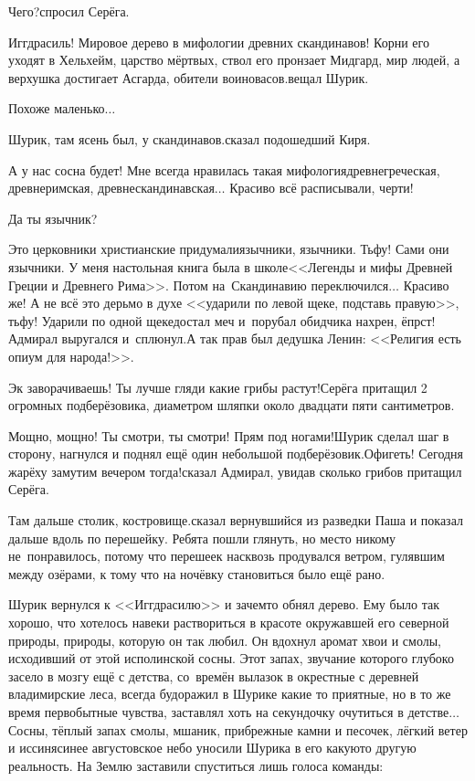 \diagdash Чего?\mdash спросил Серёга.

\diagdash Иггдрасиль! Мировое дерево в мифологии древних скандинавов! Корни его уходят в Хельхейм, царство мёртвых, ствол его пронзает Мидгард, мир людей, а верхушка достигает Асгарда, обители воинов\sdash асов.\mdash вещал Шурик. 

\diagdash Похоже маленько$\ldots$

\diagdash Шурик, там ясень был, у скандинавов.\mdash сказал подошедший Киря.

\diagdash А у нас сосна будет! Мне всегда нравилась такая мифология\mdash древнегреческая, древнеримская, древнескандинавская$\ldots$ Красиво всё расписывали, черти!

\diagdash Да ты язычник?

\diagdash Это церковники христианские придумали\mdash язычники, язычники. Тьфу! Сами они язычники. У меня настольная книга была в школе\mdash <<Легенды и мифы Древней Греции и Древнего Рима>>\cite{Кун}. Потом на~Скандинавию переключился$\ldots$ Красиво же! А не всё это дерьмо в духе <<ударили по левой щеке, подставь правую>>, тьфу! Ударили по одной щеке\mdash достал меч и~порубал обидчика нахрен, ёпрст!\mdash Адмирал выругался и~сплюнул.\mdash А так прав был дедушка Ленин: <<Религия есть  опиум для народа!>>\cite{ЛенинОпиумДляНарода}. 

\diagdash Эк заворачиваешь! Ты лучше гляди какие грибы растут!\mdash Серёга притащил 2 огромных подберёзовика, диаметром шляпки около двадцати пяти сантиметров.  

\diagdash Мощно, мощно! Ты смотри, ты смотри! Прям под ногами!\mdash Шурик сделал шаг в сторону, нагнулся и поднял ещё один небольшой подберёзовик.\mdash Офигеть! Сегодня жарёху замутим вечером тогда!\mdash сказал Адмирал, увидав сколько грибов притащил Серёга. 

\diagdash Там дальше столик, костровище.\mdash сказал вернувшийся из разведки Паша и показал дальше вдоль по перешейку. Ребята пошли глянуть, но место никому не~понравилось, потому что перешеек насквозь продувался ветром, гулявшим между озёрами, к тому что на ночёвку становиться было ещё рано. 

Шурик вернулся к <<Иггдрасилю>> и зачем\sdash то обнял дерево. Ему было так хорошо, что хотелось навеки раствориться в красоте окружавшей его северной природы, природы, которую он так любил. Он вдохнул аромат хвои и смолы, исходивший от этой исполинской сосны. Этот запах, звучание которого глубоко засело в мозгу ещё с детства, со~времён вылазок в окрестные с деревней владимирские леса, всегда будоражил в Шурике какие то приятные, но в то же время первобытные чувства, заставлял хоть на секундочку очутиться в детстве$\ldots$ Сосны, тёплый запах смолы, мшаник, прибрежные камни и песочек, лёгкий ветер и иссиня\sdash синее августовское небо уносили Шурика в его какую\sdash то другую реальность. На Землю заставили спуститься лишь голоса команды:

